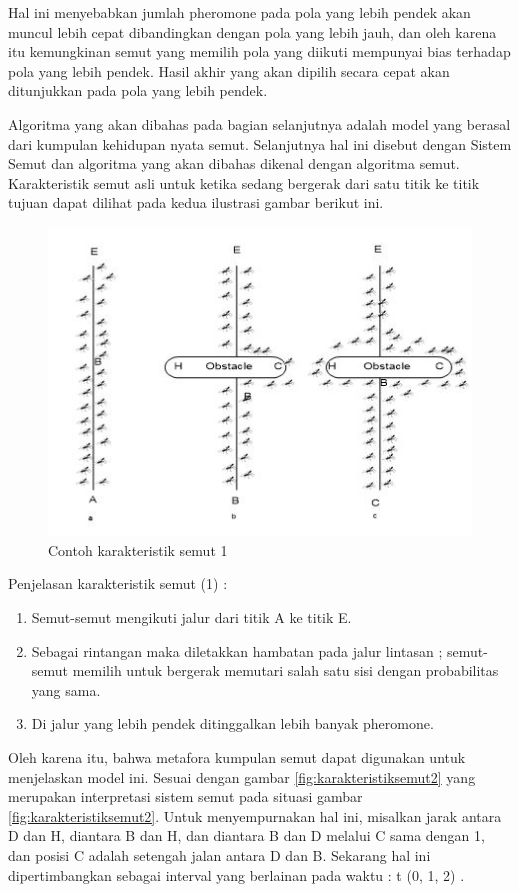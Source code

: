 \documentclass[a4paper,twoside]{article}
\begin{document}
\begin{enumerate}
\begin{itemize}
\begin{enumerate}
			Hal ini menyebabkan jumlah pheromone pada pola yang lebih pendek akan muncul lebih cepat dibandingkan dengan pola yang lebih jauh, dan oleh karena itu kemungkinan semut yang memilih pola yang diikuti mempunyai bias terhadap pola yang lebih pendek. Hasil akhir yang akan dipilih secara cepat akan ditunjukkan pada pola yang lebih pendek.
			
			Algoritma yang akan dibahas pada bagian selanjutnya adalah model yang berasal dari kumpulan kehidupan nyata semut. Selanjutnya hal ini disebut dengan Sistem Semut dan algoritma yang akan dibahas dikenal dengan algoritma semut. Karakteristik semut asli untuk ketika sedang bergerak dari satu titik ke titik tujuan dapat dilihat pada kedua ilustrasi gambar berikut ini.
			\begin{figure}[H]
				\centering
				\includegraphics[scale=0.90]{gambar5}
				\caption[Contoh Karakteristik Semut] {Contoh karakteristik semut 1}
				\label{fig:karakteristiksemut1}
			\end{figure}
		
			Penjelasan karakteristik semut (1) :
			\begin{enumerate}
				\item Semut-semut mengikuti jalur dari titik A ke titik E.
				\item Sebagai rintangan maka diletakkan hambatan pada jalur lintasan ; semut-semut memilih untuk bergerak memutari salah satu sisi dengan probabilitas yang sama.
				\item Di jalur yang lebih pendek ditinggalkan lebih banyak pheromone.\\
				
			\end{enumerate}
			
		
			Oleh karena itu, bahwa metafora kumpulan semut dapat digunakan untuk menjelaskan model ini. Sesuai dengan gambar \ref{fig:karakteristiksemut2} yang merupakan interpretasi sistem semut pada situasi gambar \ref{fig:karakteristiksemut2}. Untuk menyempurnakan hal ini, misalkan jarak antara D dan H, diantara B dan H, dan diantara B dan D melalui C sama dengan 1, dan posisi C adalah setengah jalan antara D dan B. Sekarang hal ini dipertimbangkan sebagai interval yang berlainan pada waktu : t (0, 1, 2)  .
			

\end{enumerate}
\end{itemize}
\end{enumerate}
\end{document}
